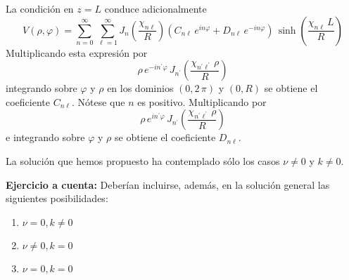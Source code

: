 La condición en $z = L$ conduce adicionalmente
\[ V (\rho, \varphi) =  \sum_{n=0}^{\infty} \, \sum_{\ell=1}^{\infty} J_{n} \left( \dfrac{\chi_{n \ell}}{R} \right)\left( C_{n \ell} \, e^{i n \varphi} +  D_{n \ell} \, e^{-i n \varphi} \right) \, \sinh \left( \dfrac{\chi_{n \ell} \, L}{R} \right) \]
Multiplicando esta expresión por 
\[ \rho \, e^{-i n^{\prime} \varphi} \, J_{n^{\prime}} \left( \dfrac{\chi_{n^{\prime} \ell^\prime} \, \rho}{R} \right) \]
integrando sobre $\varphi$ y $\rho$ en los dominios $(0, 2 \, \pi)$ y $(0, R)$ se obtiene el coeficiente $C_{n \ell}$. Nótese que $n$ es positivo. Multiplicando por 
\[ \rho \, e^{i n^{\prime} \varphi} \, J_{n^{\prime}} \left( \dfrac{\chi_{n^{\prime} \ell^\prime} \, \rho}{R} \right) \]
e integrando sobre $\varphi$ y $\rho$ se obtiene el coeficiente $D_{n \ell}$.
\par
La solución que hemos propuesto ha contemplado sólo los casos $\nu \neq 0$ y $k \neq 0$. 
\par
\textbf{Ejercicio a cuenta: } Deberían incluirse, además, en la solución general las siguientes posibilidades:
\begin{enumerate}
\item $\nu = 0, k \neq 0$
\item $\nu \neq 0, k = 0$
\item $\nu = 0, k = 0$
\end{enumerate}
